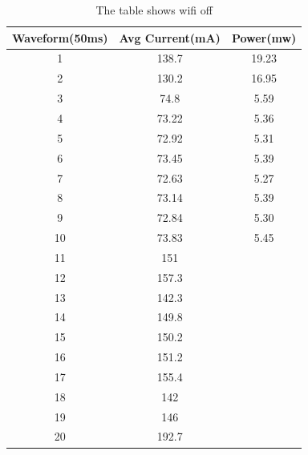 \begin{table}[h!]
\begin{center}
 \begin{tabular}{||c c c||} 
 \hline
 Waveform(50ms) & Avg Current(mA) & Power(mw)\\ [0.5ex] 
 \hline\hline
 1 & 138.7  & 19.23 \\ 
 \hline
 2 & 130.2  & 16.95 \\
 \hline
 3 & 74.8   & 5.59  \\
 \hline
 4 & 73.22  & 5.36 \\
 \hline
 \rowcolor{red}
 5 & 72.92  & 5.31 \\ 
 \hline
 6 & 73.45  & 5.39 \\ 
 \hline
 7 & 72.63  & 5.27\\
 \hline
 8 & 73.14  & 5.39 \\
 \hline
 9 & 72.84  & 5.30 \\
 \hline
 10 & 73.83 & 5.45 \\ 
 \hline
 11 & 151   &     \\
  \hline
 12 & 157.3 \\
 \hline
 \rowcolor{red}
 13 & 142.3 \\ 
 \hline
 14 & 149.8 \\ 
 \hline
 15 & 150.2 \\
 \hline
 16 & 151.2 \\
 \hline
 17 & 155.4 \\
 \hline
 18 & 142 \\
 \hline
 19 & 146 \\
 \hline
 \rowcolor{red}
 20 & 192.7 \\ 
 [1ex]
\end{tabular}
\end{center}
\caption{The table shows wifi off}
\label{Table:WIFI_OFF}
\end{table}

\newpage